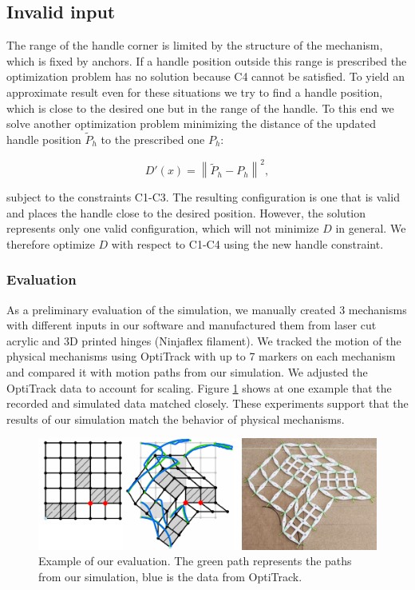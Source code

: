 \subsection{Invalid input}

The range of the handle corner is limited by the structure of the mechanism, which is fixed by anchors. If a handle position outside this range is prescribed the optimization problem has no solution because C4 cannot be satisfied. To yield an approximate result even for these situations we try to find a handle position, which is close to the desired one but in the range of the handle. To this end we solve another optimization problem minimizing the distance of the updated handle position ${\widetilde{P}}_h$ to the prescribed one $P_h$:

$$D\prime \left(x\right)=\left \| {\widetilde{P}}_h-P_h \right \|^2,$$

subject to the constraints C1-C3. The resulting configuration is one that is valid and places the handle close to the desired position. However, the solution represents only one valid configuration, which will not minimize $D$ in general. We therefore optimize $D$ with respect to C1-C4 using the new handle constraint.


\subsubsection{Evaluation}

As a preliminary evaluation of the simulation, we manually created 3 mechanisms with different inputs in our software and manufactured them from laser cut acrylic and 3D printed hinges (Ninjaflex filament). We tracked the motion of the physical mechanisms using OptiTrack with up to 7 markers on each mechanism and compared it with motion paths from our simulation. We adjusted the OptiTrack data to account for scaling. Figure \ref{fig:12-optitrack-evaluation} shows at one example that the recorded and simulated data matched closely. These experiments support that the results of our simulation match the behavior of physical mechanisms.

\begin{figure} [h]
    \includegraphics[width=\textwidth]{chapters/understanding-metamaterial-mechanisms-FIG/12-optitrack-evaluation.pdf}
    \caption[Short figure name.]{Example of our evaluation. The green path represents the paths from our simulation, blue is the data from OptiTrack.
    \label{fig:12-optitrack-evaluation}}
\end{figure}


